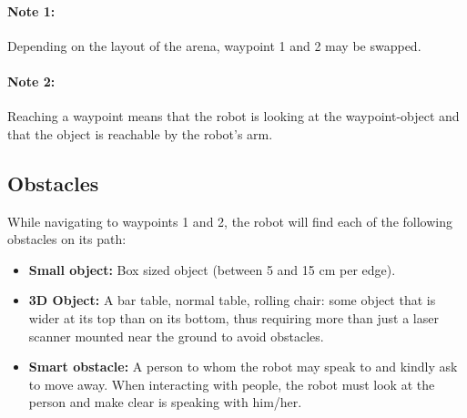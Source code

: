 \paragraph*{Note 1:} Depending on the layout of the arena, waypoint 1 and 2 may be swapped.
\paragraph*{Note 2:} Reaching a waypoint means that the robot is looking at the waypoint-object and that the object is reachable by the robot's arm. 

\subsection{Obstacles}
While navigating to waypoints 1 and 2, the robot will find each of the following obstacles on its path:
\begin{itemize}
		\item \textbf{Small object:} Box sized object (between 5 and 15 cm per edge).  
		\item \textbf{3D Object:} A bar table, normal table, rolling chair: some object that is wider at its top than on its bottom, 
		  thus requiring more than just a laser scanner mounted near the ground to avoid obstacles.
		\item \textbf{Smart obstacle:} A person to whom the robot may speak to and kindly ask to move away. 
		  When interacting with people, the robot must look at the person and make clear is speaking with him/her.
	\end{itemize}

